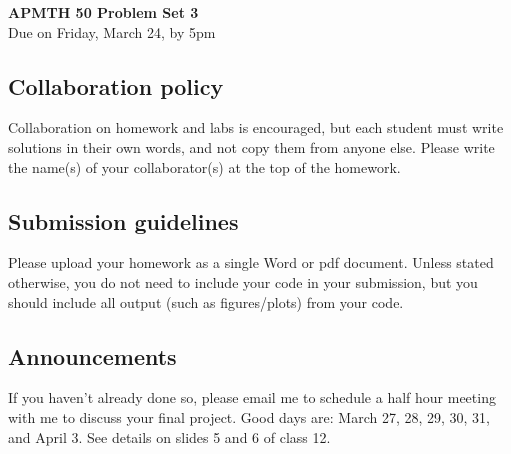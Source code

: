 \documentclass[12pt]{article}
\begin{document}
\begin{center}{\Large \bf{APMTH 50 Problem Set 3}} \vspace{0.2in}\\
{\large Due on Friday, March 24, by 5pm\\}
\end{center}

\subsection*{Collaboration policy}
Collaboration on homework and labs is
encouraged, but each student must write solutions in their own words, and not
copy them from anyone else.  Please write the name(s) of your collaborator(s) at the top of the homework.

\subsection*{Submission guidelines} Please upload your homework as a single Word or pdf document.   Unless stated otherwise, you do not need to include your code in your submission, but you should include all output (such as figures/plots) from your code.  
\subsection*{Announcements} 
If you haven't already done so, please email me to schedule a half hour meeting with me to discuss your final project.  Good days are: March 27, 28, 29, 30, 31, and April 3.  See details on slides 5 and 6 of class 12.
\end{document}
